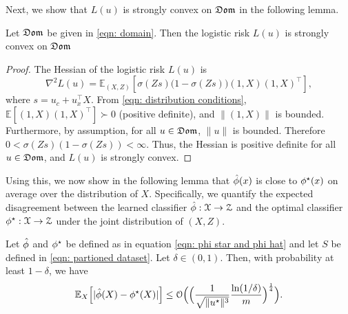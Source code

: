 Next, we show that $L(u)$ is strongly convex on $\mathfrak{Dom}$ in the following lemma.
\begin{lem}\label{lem: Strongly convex} Let $\mathfrak{Dom}$ be given in \eqref{eqn: domain}. Then the logistic risk $L(u)$ is strongly convex on $\mathfrak{Dom}$
\end{lem}

\begin{proof}
The Hessian of the logistic risk $L(u)$ is
\begin{equation*}
    \nabla^2 L(u) = \mathbb{E}_{(X,Z)}\left[ \sigma(Zs)\big(1 - \sigma(Zs)\big) (1, X)(1, X)^\top \right],
\end{equation*}
where  $s = u_c + u_x^\top X$.
From \eqref{eqn: distribution conditions}, $\mathbb{E}[(1, X)(1, X)^\top] \succ 0$ (positive definite), and $\|(1,X)\|$ is bounded. Furthermore, by assumption, for all $u \in \mathfrak{Dom}$, $\|u\|$ is bounded. Therefore $0 < \sigma(Zs)(1 - \sigma(Zs)) < \infty$. Thus, the Hessian is positive definite for all $u \in \mathfrak{Dom}$, and $L(u)$ is strongly convex.
\end{proof}

Using this, we now show in the following lemma that $\hat{\phi}(x)$ is close to $\phi^\star(x)$ on average over the distribution of $X$. Specifically, we quantify the expected disagreement between the learned classifier $\hat{\phi}: \mathcal{X} \rightarrow \mathcal{Z}$ and the optimal classifier $\phi^\star: \mathcal{X} \rightarrow \mathcal{Z}$ under the joint distribution of $(X, Z)$.

\begin{lem}\label{lem: difference between classifier from cg{X} to cg{Z}}
    Let $\hat{\phi}$ and $\phi^\star$ be defined as in equation \eqref{eqn: phi star and phi hat} and let $S$ be defined in \eqref{eqn: partioned dataset}. Let $\delta \in (0,1)$. Then, with probability at least $1-\delta$, we have
    \[
        \mathbb{E}_X \Big[| \hat{\phi}(X) - \phi^\star(X) |\Big] \leq \mathcal{O}\Big(\Big(\frac{1}{\sqrt{\|u^\star\|^3}}\frac{\ln(1/\delta)}{m}\Big)^{\frac{1}{4}}\Big).
    \]
\end{lem}



